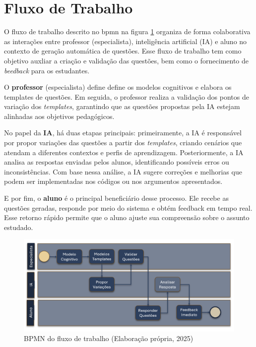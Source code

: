     
\section{Fluxo de Trabalho}

O fluxo de trabalho descrito no \gls{bpmn} na figura \ref{fig:bpmn-fluxo} organiza de forma colaborativa as interações entre professor (especialista), inteligência artificial (IA) e aluno no contexto de geração automática de questões. Esse fluxo de trabalho tem como objetivo auxliar a criação e validação das questões, bem como o fornecimento de \textit{beedback} para os estudantes. 

O \textbf{professor} (especialista) define define os modelos cognitivos  e elabora os templates de questões. Em seguida, o professor realiza a validação dos pontos de variação dos \textit{templates}, garantindo que as questões propostas pela IA estejam alinhadas aos objetivos pedagógicos.

No papel da \textbf{IA}, há duas etapas principais: primeiramente, a IA é responsável por propor variações das questões a partir dos \textit{templates}, criando cenários  que atendam a diferentes contextos e perfis de aprendizagem. Posteriormente, a IA analisa as respostas enviadas pelos alunos, identificando possíveis erros ou inconsistências. Com base nessa análise, a IA sugere correções e melhorias que podem ser implementadas nos códigos ou nos argumentos apresentados.

E por fim, o \textbf{aluno} é o principal beneficiário desse processo. Ele recebe as questões geradas, responde por meio do sistema e obtém feedback em tempo real. Esse retorno rápido permite que o aluno ajuste sua compreensão sobre o assunto estudado. 

\begin{figure}[ht]
	\centering
	\includegraphics[width=16cm]{./imagens/capitulo6/bpmn-fluxo}
	\caption{BPMN do fluxo de trabalho (Elaboração própria, 2025) }
	\label{fig:bpmn-fluxo}
\end{figure}